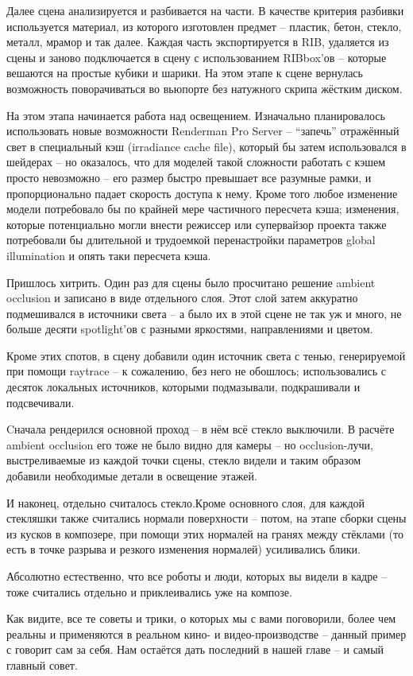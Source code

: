  Далее сцена анализируется и разбивается на части. В
    качестве критерия разбивки используется материал, из которого
    изготовлен предмет – пластик, бетон, стекло, металл, мрамор и так
    далее. Каждая часть экспортируется в RIB, удаляется из сцены и
    заново подключается в сцену с использованием RIBbox’ов – которые
    вешаются на простые кубики и шарики. На этом этапе к сцене
    вернулась возможность поворачиваться во вьюпорте без натужного
    скрипа жёстким диском.
  

 На этом этапа начинается работа над освещением.
    Изначально планировалось использовать новые возможности Renderman
    Pro Server – “запечь” отражённый свет в специальный кэш (irradiance
    cache file), который бы затем использовался в шейдерах – но
    оказалось, что для моделей такой сложности работать с кэшем просто
    невозможно – его размер быстро превышает все разумные рамки, и
    пропорционально падает скорость доступа к нему. Кроме того любое
    изменение модели потребовало бы по крайней мере частичного
    пересчета кэша; изменения, которые потенциально могли внести
    режиссер или супервайзор проекта также потребовали бы длительной и
    трудоемкой перенастройки параметров global illumination и опять
    таки пересчета кэша.
  

 Пришлось хитрить. Один раз для сцены было
    просчитано решение ambient occlusion и записано в виде отдельного
    слоя. Этот слой затем аккуратно подмешивался в источники света – а
    было их в этой сцене не так уж и много, не больше десяти
    spotlight’ов с разными яркостями, направлениями и
    цветом.
  

 Кроме этих спотов, в сцену добавили один источник
    света с тенью, генерируемой при помощи raytrace – к сожалению, без
    него не обошлось; использовались с десяток локальных источников,
    которыми подмазывали, подкрашивали и подсвечивали.
  

 Cначала рендерился основной проход – в нём всё
    стекло выключили. В расчёте ambient occlusion его тоже не было
    видно для камеры – но occlusion-лучи, выстреливаемые из каждой
    точки сцены, стекло видели и таким образом добавили необходимые
    детали в освещение этажей.
  

 И наконец, отдельно считалось стекло.Кроме
    основного слоя, для каждой стекляшки также считались нормали
    поверхности – потом, на этапе сборки сцены из кусков в композере,
    при помощи этих нормалей на гранях между стёклами (то есть в точке
    разрыва и резкого изменения нормалей) усиливались блики.
  

 Абсолютно естественно, что все роботы и люди,
    которых вы видели в кадре – тоже считались отдельно и приклеивались
    уже на композе.
  

 Как видите, все те советы и трики, о которых мы с
    вами поговорили, более чем реальны и применяются в реальном кино- и
    видео-производстве – данный пример с говорит сам за себя. Нам
    остаётся дать последний в нашей главе – и самый главный
    совет.

